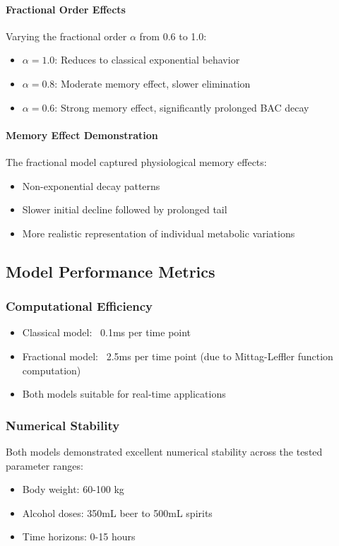 \documentclass[11pt]{article}
\begin{document}
\paragraph{Fractional Order Effects}
Varying the fractional order $\alpha$ from 0.6 to 1.0:
\begin{itemize}
    \item $\alpha = 1.0$: Reduces to classical exponential behavior
    \item $\alpha = 0.8$: Moderate memory effect, slower elimination
    \item $\alpha = 0.6$: Strong memory effect, significantly prolonged BAC decay
\end{itemize}

\paragraph{Memory Effect Demonstration}
The fractional model captured physiological memory effects:
\begin{itemize}
    \item Non-exponential decay patterns
    \item Slower initial decline followed by prolonged tail
    \item More realistic representation of individual metabolic variations
\end{itemize}

\subsection{Model Performance Metrics}

\subsubsection{Computational Efficiency}
\begin{itemize}
    \item Classical model: ~0.1ms per time point
    \item Fractional model: ~2.5ms per time point (due to Mittag-Leffler function computation)
    \item Both models suitable for real-time applications
\end{itemize}

\subsubsection{Numerical Stability}
Both models demonstrated excellent numerical stability across the tested parameter ranges:
\begin{itemize}
    \item Body weight: 60-100 kg
    \item Alcohol doses: 350mL beer to 500mL spirits
    \item Time horizons: 0-15 hours
\end{itemize}
\end{document}

